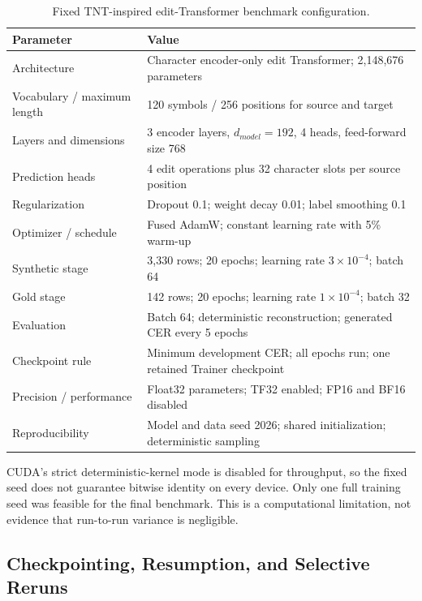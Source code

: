 \documentclass[12pt, a4paper, twoside, openany]{report}
\begin{document}
\begin{table}[H]
	\centering
	\caption{Fixed TNT-inspired edit-Transformer benchmark configuration.}
	\label{tab:training-config}
	\small
	\renewcommand{\arraystretch}{1.12}
	\begin{tabularx}{\textwidth}{>{\raggedright\arraybackslash}p{5.1cm}X}
		\toprule
		\textbf{Parameter} & \textbf{Value} \\
		\midrule
		Architecture & Character encoder-only edit Transformer; 2,148,676 parameters \\
		Vocabulary / maximum length & 120 symbols / 256 positions for source and target \\
		Layers and dimensions & 3 encoder layers, $d_{model}=192$, 4 heads, feed-forward size 768 \\
		Prediction heads & 4 edit operations plus 32 character slots per source position \\
		Regularization & Dropout 0.1; weight decay 0.01; label smoothing 0.1 \\
		Optimizer / schedule & Fused AdamW; constant learning rate with 5\% warm-up \\
		Synthetic stage & 3,330 rows; 20 epochs; learning rate $3\times10^{-4}$; batch 64 \\
		Gold stage & 142 rows; 20 epochs; learning rate $1\times10^{-4}$; batch 32 \\
		Evaluation & Batch 64; deterministic reconstruction; generated CER every 5 epochs \\
		Checkpoint rule & Minimum development CER; all epochs run; one retained Trainer checkpoint \\
		Precision / performance & Float32 parameters; TF32 enabled; FP16 and BF16 disabled \\
		Reproducibility & Model and data seed 2026; shared initialization; deterministic sampling \\
		\bottomrule
	\end{tabularx}
\end{table}

CUDA's strict deterministic-kernel mode is disabled for throughput, so the fixed seed does not guarantee bitwise identity on every device. Only one full training seed was feasible for the final benchmark. This is a computational limitation, not evidence that run-to-run variance is negligible.


\subsection{Checkpointing, Resumption, and Selective Reruns}
\end{document}
